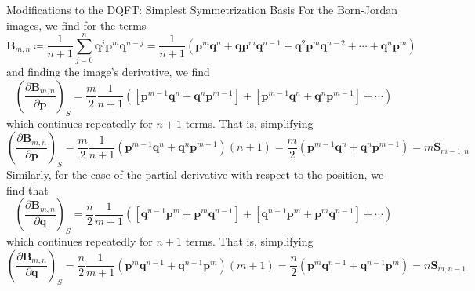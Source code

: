 \documentclass[aspectratio=169]{beamer}
\begin{document}
\begin{frame}[allowframebreaks]{Modifications to the DQFT: Simplest Symmetrization Basis}
		For the Born-Jordan images, we find for the terms
		\begin{equation}
			\textbf{B}_{m,n}\coloneqq\frac{1}{n+1}\sum_{j=0}^n\textbf{q}^j\textbf{p}^m\textbf{q}^{n-j}=\frac{1}{n+1}\left(\textbf{p}^m\textbf{q}^n+\textbf{q}\textbf{p}^m\textbf{q}^{n-1}+\textbf{q}^2\textbf{p}^m\textbf{q}^{n-2}+\cdots+\textbf{q}^n\textbf{p}^m\right)
		\end{equation}
		and finding the image's derivative, we find
		\begin{equation}
			\left( \frac{\partial\textbf{B}_{m,n}}{\partial\textbf{p}}\right)_S=\frac{m}{2}\frac{1}{n+1}\left([\textbf{p}^{m-1}\textbf{q}^n+\textbf{q}^n\textbf{p}^{m-1}]+[\textbf{p}^{m-1}\textbf{q}^n+\textbf{q}^n\textbf{p}^{m-1}]+\cdots\right) 
		\end{equation}
		which continues repeatedly for $n+1$ terms. That is, simplifying
		\begin{equation}
			\left( \frac{\partial\textbf{B}_{m,n}}{\partial\textbf{p}}\right)_S=\frac{m}{2}\frac{1}{n+1}\left(\textbf{p}^{m-1}\textbf{q}^n+\textbf{q}^n\textbf{p}^{m-1}\right)(n+1)=\frac{m}{2}\left(\textbf{p}^{m-1}\textbf{q}^n+\textbf{q}^n\textbf{p}^{m-1}\right)=m\textbf{S}_{m-1,n}
		\end{equation}
		Similarly, for the case of the partial derivative with respect to the position, we find that
		\begin{equation}
			\left( \frac{\partial\textbf{B}_{m,n}}{\partial\textbf{q}}\right)_S=\frac{n}{2}\frac{1}{m+1}\left([\textbf{q}^{n-1}\textbf{p}^m+\textbf{p}^m\textbf{q}^{n-1}]+[\textbf{q}^{n-1}\textbf{p}^m+\textbf{p}^m\textbf{q}^{n-1}]+\cdots\right) 
		\end{equation}
		which continues repeatedly for $n+1$ terms. That is, simplifying
		\begin{equation}
			\left( \frac{\partial\textbf{B}_{m,n}}{\partial\textbf{q}}\right)_S=\frac{n}{2}\frac{1}{m+1}\left(\textbf{p}^{m}\textbf{q}^{n-1}+\textbf{q}^{n-1}\textbf{p}^{m}\right)(m+1)=\frac{n}{2}\left(\textbf{p}^{m}\textbf{q}^{n-1}+\textbf{q}^{n-1}\textbf{p}^{m}\right)=n\textbf{S}_{m,n-1}
		\end{equation}
		

\end{frame}
\end{document}
